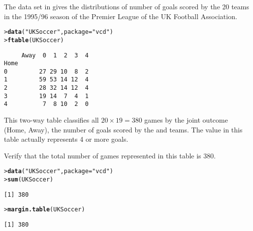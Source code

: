 \documentclass[11pt]{report}\usepackage[]{graphicx}\usepackage[]{color}
\makeatletter
\newcommand{\hlstr}[1]{\textcolor[rgb]{0.192,0.494,0.8}{#1}}%
\newcommand{\hlstd}[1]{\textcolor[rgb]{0.345,0.345,0.345}{#1}}%
\newcommand{\hlkwc}[1]{\textcolor[rgb]{0.333,0.667,0.333}{#1}}%
\newcommand{\hlkwd}[1]{\textcolor[rgb]{0.737,0.353,0.396}{\textbf{#1}}}%
\newenvironment{kframe}{%
 \def\at@end@of@kframe{}%
 \ifinner\ifhmode%
  \def\at@end@of@kframe{\end{minipage}}%
  \begin{minipage}{\columnwidth}%
 \fi\fi%
 \def\FrameCommand##1{\hskip\@totalleftmargin \hskip-\fboxsep
 \colorbox{shadecolor}{##1}\hskip-\fboxsep
     \hskip-\linewidth \hskip-\@totalleftmargin \hskip\columnwidth}%
 \MakeFramed {\advance\hsize-\width
   \@totalleftmargin\z@ \linewidth\hsize
   \@setminipage}}%
 {\par\unskip\endMakeFramed%
 \at@end@of@kframe}
\newenvironment{knitrout}{}{} %
\renewenvironment{knitrout}{\small\renewcommand{\baselinestretch}{.85}}{} %
\makeatother
\begin{document}
\begin{Exercises}
\begin{enumerate*}
  \end{enumerate*}

\exercise The data set  in  gives the distributions of
number of goals scored by the 20 teams in the  1995/96 season of the
Premier League of the UK Football Association.
\begin{knitrout}
\color{fgcolor}\begin{kframe}
\begin{alltt}
\hlstd{> }\hlkwd{data}\hlstd{(}\hlstr{"UKSoccer"}\hlstd{,} \hlkwc{package} \hlstd{=} \hlstr{"vcd"}\hlstd{)}
\hlstd{> }\hlkwd{ftable}\hlstd{(UKSoccer)}
\end{alltt}
\begin{verbatim}
     Away  0  1  2  3  4
Home                    
0         27 29 10  8  2
1         59 53 14 12  4
2         28 32 14 12  4
3         19 14  7  4  1
4          7  8 10  2  0
\end{verbatim}
\end{kframe}
\end{knitrout}
This two-way table classifies all $20 \times 19 = 380$ games by the joint
outcome (Home, Away), the number of goals scored by the  and
 teams.
The value  in this table actually represents 4 or more goals.

  \begin{enumerate*}
    \item Verify that the total number of games represented in this table is 380.
    \begin{ans}
\begin{knitrout}
\color{fgcolor}\begin{kframe}
\begin{alltt}
\hlstd{> }\hlkwd{data}\hlstd{(}\hlstr{"UKSoccer"}\hlstd{,} \hlkwc{package}\hlstd{=}\hlstr{"vcd"}\hlstd{)}
\hlstd{> }\hlkwd{sum}\hlstd{(UKSoccer)}
\end{alltt}
\begin{verbatim}
[1] 380
\end{verbatim}
\begin{alltt}
\hlstd{> }\hlkwd{margin.table}\hlstd{(UKSoccer)}
\end{alltt}
\begin{verbatim}
[1] 380
\end{verbatim}
\end{kframe}
\end{knitrout}
    \end{ans}
    

\end{enumerate*}
\end{Exercises}
\end{document}
